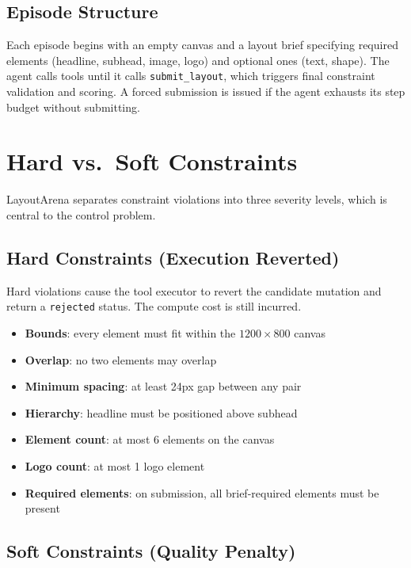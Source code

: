 \documentclass[10pt,twocolumn]{article}
\begin{document}
\subsection{Episode Structure}

Each episode begins with an empty canvas and a layout brief specifying required elements (headline, subhead, image, logo) and optional ones (text, shape). The agent calls tools until it calls \texttt{submit\_layout}, which triggers final constraint validation and scoring. A forced submission is issued if the agent exhausts its step budget without submitting.

\section{Hard vs.\ Soft Constraints}

LayoutArena separates constraint violations into three severity levels, which is central to the control problem.

\subsection{Hard Constraints (Execution Reverted)}

Hard violations cause the tool executor to revert the candidate mutation and return a \texttt{rejected} status. The compute cost is still incurred.

\begin{itemize}[leftmargin=*,itemsep=1pt]
    \item \textbf{Bounds}: every element must fit within the $1200 \times 800$ canvas
    \item \textbf{Overlap}: no two elements may overlap
    \item \textbf{Minimum spacing}: at least 24px gap between any pair
    \item \textbf{Hierarchy}: headline must be positioned above subhead
    \item \textbf{Element count}: at most 6 elements on the canvas
    \item \textbf{Logo count}: at most 1 logo element
    \item \textbf{Required elements}: on submission, all brief-required elements must be present
\end{itemize}

\subsection{Soft Constraints (Quality Penalty)}
\end{document}

